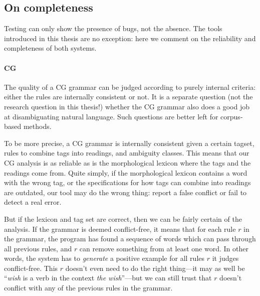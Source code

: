 \subsection{On completeness}

Testing can only show the presence of bugs, not the absence. The tools
introduced in this thesis are no exception: here we comment on the
reliability and completeness of both systems.


\paragraph{CG}

The quality of a CG grammar can be judged according to purely internal
criteria: either the rules are internally consistent or not. It is a
separate question (not the research question in this thesis!) whether
the CG grammar also does a good job at disambiguating natural
language. Such questions are better left for corpus-based methods.

To be more precise, a CG grammar is internally consistent given a
certain tagset, rules to combine tags into readings, and ambiguity
classes. %
This means that our CG analysis is as reliable as is the morphological
lexicon where the tags and the readings come from. Quite simply, if
the morphological lexicon contains a word with the wrong tag, or the
specifications for how tags can combine into readings are outdated,
our tool may do the wrong thing: report a false conflict or fail to
detect a real error.

But if the lexicon and tag set are correct, then we can be fairly
certain of the analysis. If the grammar is deemed conflict-free, it
means that for each rule $r$ in the grammar, the program has found a
sequence of words which can pass through all previous rules, and $r$
can remove something from at least one word. In other words, the
system has to \emph{generate} a positive example for all rules $r$ it
judges conflict-free. %
This $r$ doesn't even need to do the right thing---it may as well be
``\emph{wish} is a verb in the context \emph{the wish}''---but we can
still trust that $r$ doesn't conflict with any of the previous rules
in the grammar.



